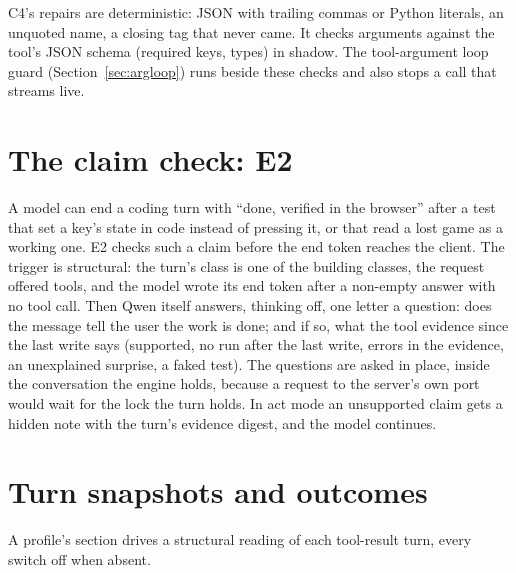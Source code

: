 C4's repairs are deterministic: JSON with trailing commas or Python literals, an unquoted name, a closing tag that never came. It checks arguments against the tool's JSON schema (required keys, types) in shadow. The tool-argument loop guard (Section~\ref{sec:argloop}) runs beside these checks and also stops a call that streams live.

\section{The claim check: E2}

A model can end a coding turn with \enquote{done, verified in the browser} after a test that set a key's state in code instead of pressing it, or that read a lost game as a working one. E2 checks such a claim before the end token reaches the client. The trigger is structural: the turn's class is one of the building classes, the request offered tools, and the model wrote its end token after a non-empty answer with no tool call. Then Qwen itself answers, thinking off, one letter a question: does the message tell the user the work is done; and if so, what the tool evidence since the last write says (supported, no run after the last write, errors in the evidence, an unexplained surprise, a faked test). The questions are asked in place, inside the conversation the engine holds, because a request to the server's own port would wait for the lock the turn holds. In act mode an unsupported claim gets a hidden note with the turn's evidence digest, and the model continues.

\section{Turn snapshots and outcomes}

A profile's  section drives a structural reading of each tool-result turn, every switch off when absent.

